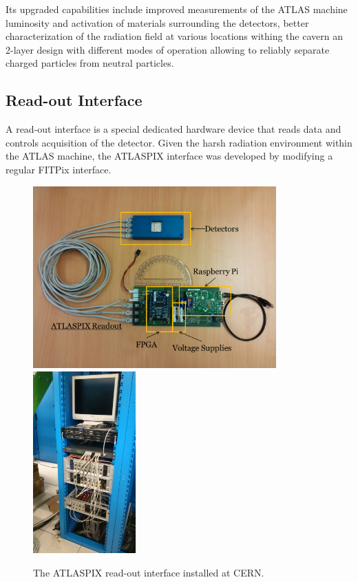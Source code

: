 Its upgraded capabilities include improved measurements of the ATLAS machine luminosity and activation of materials surrounding the detectors, better characterization of the radiation field at various locations withing the cavern an 2-layer design with different modes of operation allowing to reliably separate charged particles from neutral particles.

\subsection{Read-out Interface}
A read-out interface is a special dedicated hardware device that reads data and controls acquisition of the detector. \cite{TurecekThesis2011} Given the harsh radiation environment within the ATLAS machine, the ATLASPIX interface was developed by modifying a regular FITPix interface.

\begin{figure}[t]
\begin{center}
\includegraphics[height=7cm]{figures/imported/atlaspix}
\includegraphics[height=7cm]{figures/imported/atlaspix-installed}
\caption{The ATLASPIX read-out interface installed at CERN.}
\label{fig:ATLASPIX}
\end{center}
\end{figure}

